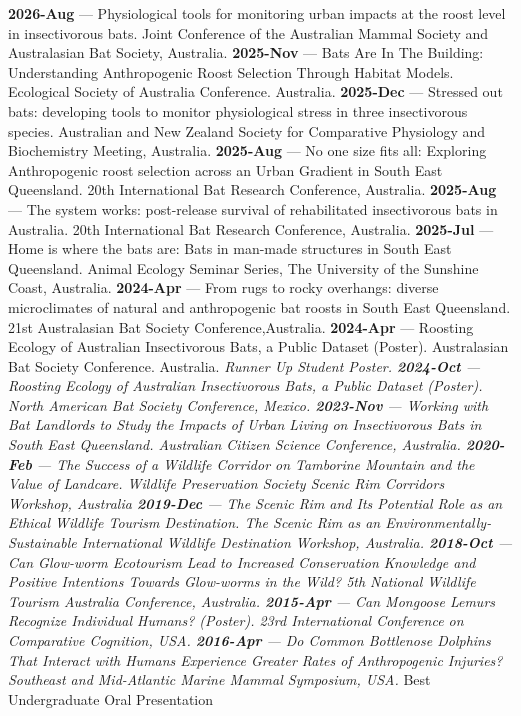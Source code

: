 \documentclass[
]{article}
\begin{document}
\textbf{2026-Aug} --- Physiological tools for monitoring urban impacts
at the roost level in insectivorous bats. Joint Conference of the
Australian Mammal Society and Australasian Bat Society, Australia.
\textbf{2025-Nov} --- Bats Are In The Building: Understanding
Anthropogenic Roost Selection Through Habitat Models. Ecological Society
of Australia Conference. Australia. \textbf{2025-Dec} --- Stressed out
bats: developing tools to monitor physiological stress in three
insectivorous species. Australian and New Zealand Society for
Comparative Physiology and Biochemistry Meeting, Australia.
\textbf{2025-Aug} --- No one size fits all: Exploring Anthropogenic
roost selection across an Urban Gradient in South East Queensland. 20th
International Bat Research Conference, Australia. \textbf{2025-Aug} ---
The system works: post-release survival of rehabilitated insectivorous
bats in Australia. 20th International Bat Research Conference,
Australia. \textbf{2025-Jul} --- Home is where the bats are: Bats in
man-made structures in South East Queensland. Animal Ecology Seminar
Series, The University of the Sunshine Coast, Australia.
\textbf{2024-Apr} --- From rugs to rocky overhangs: diverse
microclimates of natural and anthropogenic bat roosts in South East
Queensland. 21st Australasian Bat Society Conference,Australia.
\textbf{2024-Apr} --- Roosting Ecology of Australian Insectivorous Bats,
a Public Dataset (Poster). Australasian Bat Society Conference.
Australia. \emph{Runner Up Student Poster. \textbf{2024-Oct} ---
Roosting Ecology of Australian Insectivorous Bats, a Public Dataset
(Poster). North American Bat Society Conference, Mexico.
\textbf{2023-Nov} --- Working with Bat Landlords to Study the Impacts of
Urban Living on Insectivorous Bats in South East Queensland. Australian
Citizen Science Conference, Australia. \textbf{2020-Feb} --- The Success
of a Wildlife Corridor on Tamborine Mountain and the Value of Landcare.
Wildlife Preservation Society Scenic Rim Corridors Workshop, Australia
\textbf{2019-Dec} --- The Scenic Rim and Its Potential Role as an
Ethical Wildlife Tourism Destination. The Scenic Rim as an
Environmentally-Sustainable International Wildlife Destination Workshop,
Australia. \textbf{2018-Oct} --- Can Glow-worm Ecotourism Lead to
Increased Conservation Knowledge and Positive Intentions Towards
Glow-worms in the Wild? 5th National Wildlife Tourism Australia
Conference, Australia. \textbf{2015-Apr} --- Can Mongoose Lemurs
Recognize Individual Humans? (Poster). 23rd International Conference on
Comparative Cognition, USA. \textbf{2016-Apr} --- Do Common Bottlenose
Dolphins That Interact with Humans Experience Greater Rates of
Anthropogenic Injuries? Southeast and Mid-Atlantic Marine Mammal
Symposium, USA. }Best Undergraduate Oral Presentation
\end{document}

